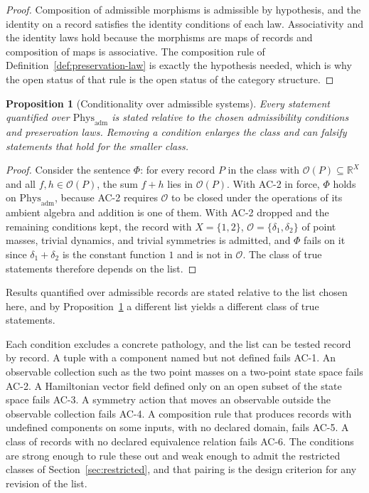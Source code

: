 \documentclass[11pt,letterpaper]{article}
\newtheorem{proposition}[theorem]{Proposition}
\theoremstyle{definition}
\theoremstyle{remark}
\begin{document}
\begin{proof}
Composition of admissible morphisms is admissible by hypothesis, and the identity on a record satisfies the identity conditions of each law. Associativity and the identity laws hold because the morphisms are maps of records and composition of maps is associative. The composition rule of Definition~\ref{def:preservation-law} is exactly the hypothesis needed, which is why the open status of that rule is the open status of the category structure.
\end{proof}

\begin{proposition}[Conditionality over admissible systems]
\label{prop:conditional}
Every statement quantified over $\mathrm{Phys}_{\mathrm{adm}}$ is stated relative to the chosen admissibility conditions and preservation laws. Removing a condition enlarges the class and can falsify statements that hold for the smaller class.
\end{proposition}

\begin{proof}
Consider the sentence $\Phi$: for every record $P$ in the class with $\mathcal{O}(P) \subseteq \mathbb{R}^{X}$ and all $f, h \in \mathcal{O}(P)$, the sum $f + h$ lies in $\mathcal{O}(P)$. With AC-2 in force, $\Phi$ holds on $\mathrm{Phys}_{\mathrm{adm}}$, because AC-2 requires $\mathcal{O}$ to be closed under the operations of its ambient algebra and addition is one of them. With AC-2 dropped and the remaining conditions kept, the record with $X = \{1, 2\}$, $\mathcal{O} = \{\delta_1, \delta_2\}$ of point masses, trivial dynamics, and trivial symmetries is admitted, and $\Phi$ fails on it since $\delta_1 + \delta_2$ is the constant function $1$ and is not in $\mathcal{O}$. The class of true statements therefore depends on the list.
\end{proof}

Results quantified over admissible records are stated relative to the list chosen here, and by Proposition~\ref{prop:conditional} a different list yields a different class of true statements.

Each condition excludes a concrete pathology, and the list can be tested record by record. A tuple with a component named but not defined fails AC-1. An observable collection such as the two point masses on a two-point state space fails AC-2. A Hamiltonian vector field defined only on an open subset of the state space fails AC-3. A symmetry action that moves an observable outside the observable collection fails AC-4. A composition rule that produces records with undefined components on some inputs, with no declared domain, fails AC-5. A class of records with no declared equivalence relation fails AC-6. The conditions are strong enough to rule these out and weak enough to admit the restricted classes of Section~\ref{sec:restricted}, and that pairing is the design criterion for any revision of the list.
\end{document}
